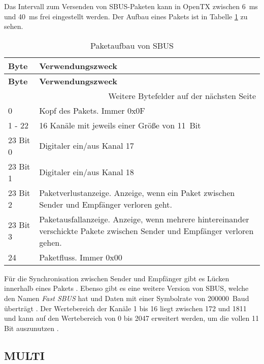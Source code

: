 Das Intervall zum Versenden von SBUS-Paketen kann in OpenTX zwischen 6~ms und 40~ms frei eingestellt werden. Der Aufbau eines Pakets ist in Tabelle \ref{table:sbusPaket} zu sehen.

\begin{longtable}[c]{|p{3cm}|p{12cm}|}
    \caption{Paketaufbau von SBUS \cite{BolderFlight}}
    \label{table:sbusPaket}\\
    \hline
    \textbf{Byte} & \textbf{Verwendungszweck}\\
    \hline
    \hline
    \endfirsthead

    \hline
    \textbf{Byte} & \textbf{Verwendungszweck}\\
    \hline
    \hline
    \endhead

    \hline
    \multicolumn{2}{|r|}{Weitere Bytefelder auf der nächsten Seite}\\
    \hline
    \endfoot

    \hline
    \endlastfoot
    
    0 & Kopf des Pakets. Immer 0x0F \\
    \hline
    1 - 22 & 16 Kanäle mit jeweils einer Größe von 11~Bit \\
    \hline
    23 Bit 0 & Digitaler ein/aus Kanal 17 \\
    \hline
    23 Bit 1 & Digitaler ein/aus Kanal 18 \\
    \hline
    23 Bit 2 & Paketverlustanzeige. Anzeige, wenn ein Paket zwischen Sender und Empfänger verloren geht. \\
    \hline
    23 Bit 3 & Paketausfallanzeige. Anzeige, wenn mehrere hintereinander verschickte Pakete zwischen Sender und Empfänger verloren gehen. \\
    \hline
    24 & Paketfluss. Immer 0x00 \cite{sigrokSBus} \\
\end{longtable}

Für die Synchronisation zwischen Sender und Empfänger gibt es Lücken innerhalb eines Pakets \cite{sigrokSBus}. Ebenso gibt es eine weitere Version von SBUS, welche den Namen \textit{Fast SBUS} hat und Daten mit einer Symbolrate von 200000~Baud überträgt \cite{BolderFlight}. Der Wertebereich der Kanäle 1 bis 16 liegt zwischen 172 und 1811 und kann auf den Wertebereich von 0 bis 2047 erweitert werden, um die vollen 11 Bit auszunutzen \cite{BolderFlight}. 

\subsection{MULTI}


